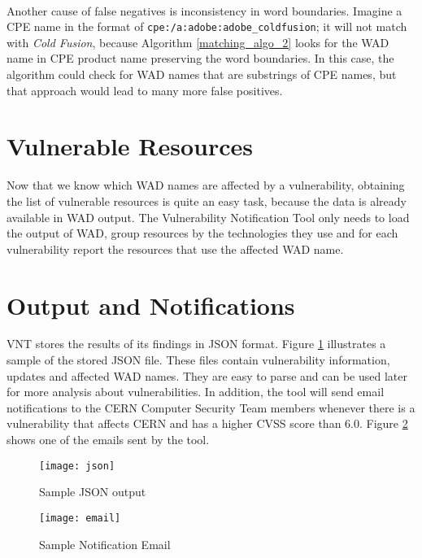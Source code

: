 \paragraph{}
Another cause of false negatives is inconsistency in word boundaries. Imagine a CPE name in the format of \texttt{cpe:/a:adobe:adobe\_coldfusion}; it will not match with \textit{Cold Fusion}, because Algorithm \ref{matching_algo_2} looks for the WAD name in CPE product name preserving the word boundaries. In this case, the algorithm could check for WAD names that are substrings of CPE names, but that approach would lead to many more false positives.

\section{Vulnerable Resources}
Now that we know which WAD names are affected by a vulnerability, obtaining the list of vulnerable resources is quite an easy task, because the data is already available in WAD output. The Vulnerability Notification Tool only needs to load the output of WAD, group resources by the technologies they use and for each vulnerability report the resources that use the affected WAD name.
\section{Output and Notifications}
VNT stores the results of its findings in JSON format. Figure \ref{figure:json_output} illustrates a sample of the stored JSON file. These files contain vulnerability information, updates and affected WAD names. They are easy to parse and can be used later for more analysis about vulnerabilities.
In addition, the tool will send email notifications to the CERN Computer Security Team members whenever there is a vulnerability that affects CERN and has a higher CVSS score than 6.0. Figure \ref{figure:email_output} shows one of the emails sent by the tool.
\\
\begin{figure}[h!]

  \centering
    \texttt{[image: json]}
  \caption{Sample JSON output}
   \label{figure:json_output}
\end{figure}

\begin{figure}[h!]
  \centering
    \texttt{[image: email]}
  \caption{Sample Notification Email}
 \label{figure:email_output}

\end{figure}



